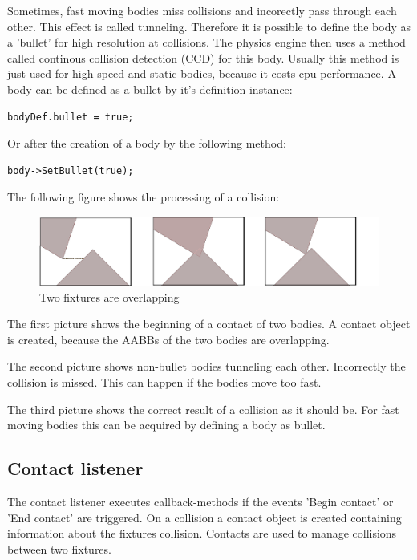 \documentclass[10pt,a4paper,DIV=11]{scrreprt}
\begin{document}
Sometimes, fast moving bodies miss collisions and incorectly pass through each other. This effect is called tunneling. Therefore it is possible to define the body as a 'bullet' for high resolution at collisions. The physics engine then uses a method called continous collision detection (CCD) for this body. Usually this method is just used for high speed and static bodies, because it costs cpu performance. 
A body can be defined as a bullet by it's definition instance:

\begin{lstlisting}[caption={Define fixture as bullet before creation},label=lst:fixture-bullet-before]
bodyDef.bullet = true;
\end{lstlisting}

Or after the creation of a body by the following method:

\begin{lstlisting}[caption={Define fixture as bullet after creation},label=lst:fixture-bullet-after]
body->SetBullet(true);
\end{lstlisting}

The following figure shows the processing of a collision:

\begin{center}
	\begin{figure}[H]
		\centering
		\includegraphics[width=1.0\textwidth,scale=1.0]{files/fixtures-overlap.png}
		\caption{Two fixtures are overlapping \cite{iforce}}
		\label{fig:fixture-overlap}
	\end{figure}
\end{center}

The first picture shows the beginning of a contact of two bodies. A contact object is created, because the AABBs of the two bodies are overlapping.

The second picture shows non-bullet bodies tunneling each other. Incorrectly the collision is missed. This can happen if the bodies move too fast.

The third picture shows the correct result of a collision as it should be. For fast moving bodies this can be acquired by defining a body as bullet.

\subsection{Contact listener}
The contact listener executes callback-methods if the events 'Begin contact' or 'End contact' are triggered.
On a collision a contact object is created containing information about the fixtures collision.
Contacts are used to manage collisions between two fixtures.
\end{document}
